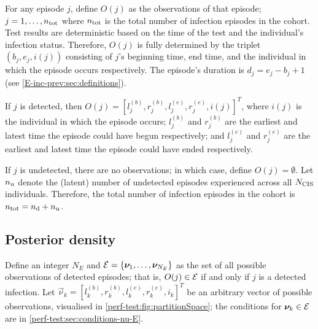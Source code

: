 \documentclass[thesis.tex]{subfiles}
\begin{document}
For any episode $j$, define $O(j)$ as the observations of that episode; $j = 1, \dots, n_\text{tot}$ where $n_\text{tot}$ is the total number of infection episodes in the cohort.
Test results are deterministic based on the time of the test and the individual's infection status.
Therefore, $O(j)$ is fully determined by the triplet $(b_j, e_j, i(j))$ consisting of $j$'s beginning time, end time, and the individual in which the episode occurs respectively.
The episode's duration is $d_j = e_j - b_j + 1$ (see \cref{E-inc-prev:sec:definitions}).

If $j$ is detected, then $O(j) = [l_j^{(b)}, r_j^{(b)}, l_j^{(e)}, r_j^{(e)}, i(j)]^T$, where $i(j)$ is the individual in which the episode occurs; $l_j^{(b)}$ and $r_j^{(b)}$ are the earliest and latest time the episode could have begun respectively; and $l_j^{(e)}$ and $r_j^{(e)}$ are the earliest and latest time the episode could have ended respectively.

If $j$ is undetected, there are no observations; in which case, define $O(j) = \emptyset$.
Let $n_\text{u}$ denote the (latent) number of undetected episodes experienced across all $N_\text{CIS}$ individuals.
Therefore, the total number of infection episodes in the cohort is $n_\text{tot} = n_\text{d} + n_\text{u}$.


\subsection{Posterior density} \label{perf-test:sec:posterior}

Define an integer $N_E$ and $\mathcal{E} = \{ \bm{\nu}_1, \dots, \bm{\nu}_{N_E} \}$ as the set of all possible observations of detected episodes; that is, $O(j) \in \mathcal{E}$ if and only if $j$ is a detected infection.
Let $\vec{\nu}_k = [l^{(b)}_k, r^{(b)}_k, l^{(e)}_k, r^{(e)}_k, i_k]^T$ be an arbitrary vector of possible observations, visualised in \cref{perf-test:fig:partitionSpace}; the conditions for $\bm{\nu}_k \in \mathcal{E}$ are in \cref{perf-test:sec:conditions-nu-E}.
\end{document}
